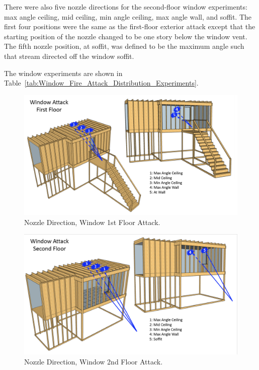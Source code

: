 \documentclass[12pt,oneside]{book}
\begin{document}
There were also five nozzle directions for the second-floor window experiments: max angle ceiling, mid ceiling, min angle ceiling, max angle wall, and soffit. The first four positions were the same as the first-floor exterior attack except that the starting position of the nozzle changed to be one story below the window vent. The fifth nozzle position, at soffit, was defined to be the maximum angle such that stream directed off the window soffit.

The window experiments are shown in Table~\ref{tab:Window_Fire_Attack_Distribution_Experiments}.

\begin{figure}[!ht]
	\centering
	\includegraphics[width=\columnwidth]{Figures/Water_Distribution/Nozzle_Position_ExtFirstfloor}
	\caption[Nozzle Direction, Window 1st Floor Attack]{Nozzle Direction, Window 1st Floor Attack.}
	\label{fig:Nozzle_Direction_Window_1st_Floor_Attack}
\end{figure}

\begin{figure}[!ht]
	\centering
	\includegraphics[width=\columnwidth]{Figures/Water_Distribution/Nozzle_Position_ExtSecondfloor}
	\caption[Nozzle Direction, Window 2nd Floor Attack]{Nozzle Direction, Window 2nd Floor Attack.}
	\label{fig:Nozzle_Direction_Window_2nd_Floor_Attack}
\end{figure}
\end{document}
